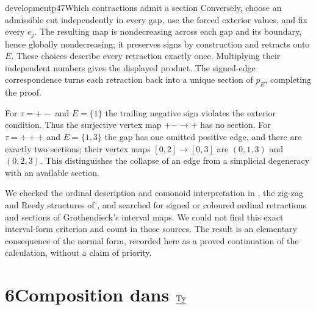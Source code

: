 \begin{dcomment}{development}{p47}{Which contractions admit a section}
Conversely, choose an admissible cut independently in every gap, use the forced exterior values, and fix every $e_j$. The resulting map is nondecreasing across each gap and its boundary, hence globally nondecreasing; it preserves signs by construction and retracts onto $E$. These choices describe every retraction exactly once. Multiplying their independent numbers gives the displayed product. The signed-edge correspondence turns each retraction back into a unique section of $p_E$, completing the proof.

For $\tau=+-$ and $E=\{1\}$ the trailing negative sign violates the exterior condition. Thus the surjective vertex map $+ -\to+$ has no section. For $\tau=+++$ and $E=\{1,3\}$ the gap has one omitted positive edge, and there are exactly two sections; their vertex maps $[0,2]\to[0,3]$ are $(0,1,3)$ and $(0,2,3)$. This distinguishes the collapse of an edge from a simplicial degeneracy with an available section.

We checked the ordinal description and comonoid interpretation in \citet[Appendix~D]{AguiarMahajan2010}, the zig-zag and Reedy structures of \citet[Definition~1.1 and Example~4.12]{ArakawaCnossen2026}, and searched for signed or coloured ordinal retractions and sections of Grothendieck's interval maps. We could not find this exact interval-form criterion and count in those sources. The result is an elementary consequence of the normal form, recorded here as a proved continuation of the calculation, without a claim of priority.
\end{dcomment}


\section*{6\quad Composition dans $\underline{\mathrm{Ty}}$}


